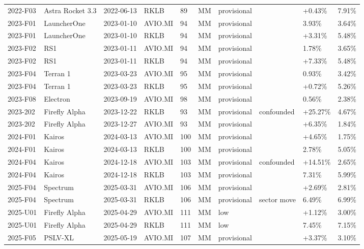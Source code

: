\documentclass[12pt,a4paper]{article}
\begin{document}
{\begin{xltabular}{\textwidth}{lllllllXll}
2022-F03 & Astra Rocket 3.3 & 2022-06-13 & RKLB & 89 & MM & provisional &  & +0.43\% & 7.91\% \\
2023-F01 & LauncherOne & 2023-01-10 & AVIO.MI & 94 & MM & provisional &  & \textminus{}3.93\% & 3.64\% \\
2023-F01 & LauncherOne & 2023-01-10 & RKLB & 94 & MM & provisional &  & +3.31\% & 5.48\% \\
2023-F02 & RS1 & 2023-01-11 & AVIO.MI & 94 & MM & provisional &  & \textminus{}1.78\% & 3.65\% \\
2023-F02 & RS1 & 2023-01-11 & RKLB & 94 & MM & provisional &  & +7.33\% & 5.48\% \\
2023-F04 & Terran 1 & 2023-03-23 & AVIO.MI & 95 & MM & provisional &  & \textminus{}0.93\% & 3.42\% \\
2023-F04 & Terran 1 & 2023-03-23 & RKLB & 95 & MM & provisional &  & +0.72\% & 5.26\% \\
2023-F08 & Electron & 2023-09-19 & AVIO.MI & 98 & MM & provisional &  & \textminus{}0.56\% & 2.38\% \\
2023-202 & Firefly Alpha & 2023-12-22 & RKLB & 93 & MM & provisional & confounded & +25.27\% & 4.67\% \\
2023-202 & Firefly Alpha & 2023-12-27 & AVIO.MI & 93 & MM & provisional &  & +6.35\% & 1.84\% \\
2024-F01 & Kairos & 2024-03-13 & AVIO.MI & 100 & MM & provisional &  & +4.65\% & 1.75\% \\
2024-F01 & Kairos & 2024-03-13 & RKLB & 100 & MM & provisional &  & \textminus{}2.78\% & 5.05\% \\
2024-F04 & Kairos & 2024-12-18 & AVIO.MI & 103 & MM & provisional & confounded & +14.51\% & 2.65\% \\
2024-F04 & Kairos & 2024-12-18 & RKLB & 103 & MM & provisional &  & \textminus{}7.31\% & 5.99\% \\
2025-F04 & Spectrum & 2025-03-31 & AVIO.MI & 106 & MM & provisional &  & +2.69\% & 2.81\% \\
2025-F04 & Spectrum & 2025-03-31 & RKLB & 106 & MM & provisional & sector move & \textminus{}6.49\% & 6.99\% \\
2025-U01 & Firefly Alpha & 2025-04-29 & AVIO.MI & 111 & MM & low &  & +1.12\% & 3.00\% \\
2025-U01 & Firefly Alpha & 2025-04-29 & RKLB & 111 & MM & low &  & \textminus{}7.45\% & 7.15\% \\
2025-F05 & PSLV-XL & 2025-05-19 & AVIO.MI & 107 & MM & provisional &  & +3.37\% & 3.10\% \\

\end{xltabular}}
\end{document}
